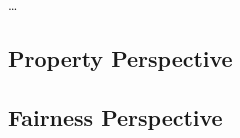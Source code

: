\ldots

\subsection{Property Perspective}
\label{sec:arguments_property}


\subsection{Fairness Perspective}
\label{sec:arguments_fairness}
